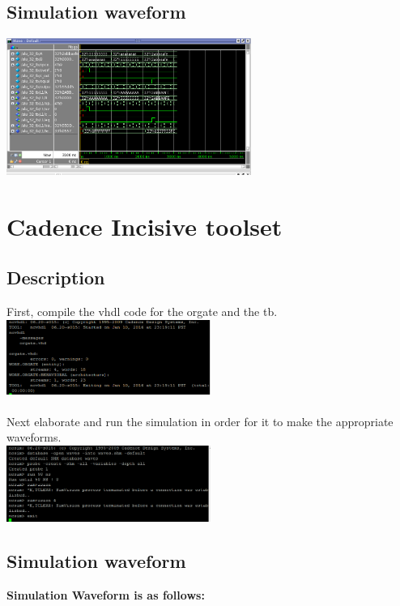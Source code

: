 \documentclass{article}
\begin{document}
	\subsection{Simulation waveform}

	\includegraphics[width=0.6\textwidth]{Questasim_waveform.png}

\section{Cadence Incisive toolset}

	\subsection{Description}
		First, compile the vhdl code for the orgate and the tb.\\
	\includegraphics[width=0.5\textwidth]{cadence1.png}\\\\
		Next elaborate and run the simulation in order for it to make the appropriate waveforms.\\
	\includegraphics[width=0.5\textwidth]{cadence2.png}

	\subsection{Simulation waveform}

	\bfseries{Simulation Waveform is as follows:} \\ \\
\end{document}
